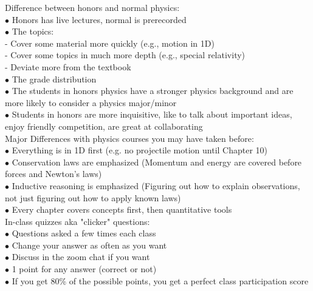     \noindent Difference between honors and normal physics: \\
    $\bullet$ Honors has live lectures, normal is prerecorded \\
    $\bullet$ The topics: \\
    - Cover some material more quickly (e.g., motion in 1D) \\
    - Cover some topics in much more depth (e.g., special relativity) \\
    - Deviate more from the textbook \\
    $\bullet$ The grade distribution \\
    $\bullet$ The students in honors physics have a stronger physics background and are more likely to consider a physics major/minor \\
    $\bullet$ Students in honors are more inquisitive, like to talk about important ideas, enjoy friendly competition, are great at collaborating \\

    \noindent Major Differences with physics courses you may have taken before: \\
    $\bullet$ Everything is in 1D first (e.g. no projectile motion until Chapter 10) \\
    $\bullet$ Conservation laws are emphasized (Momentum and energy are covered before forces and Newton's laws) \\
    $\bullet$ Inductive reasoning is emphasized (Figuring out how to explain observations, not just figuring out how to apply known laws) \\
    $\bullet$ Every chapter covers concepts first, then quantitative tools \\

    \noindent In-class quizzes aka "clicker" questions: \\
    $\bullet$ Questions asked a few times each class \\
    $\bullet$ Change your answer as often as you want \\
    $\bullet$ Discuss in the zoom chat if you want\\
    $\bullet$ 1 point for any answer (correct or not) \\
    $\bullet$ If you get 80\% of the possible points, you get a perfect class participation score